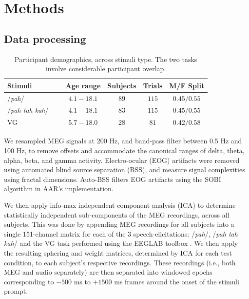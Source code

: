 \documentclass[a4paper]{article}
\begin{document}
\section{Methods}


\subsection{Data processing}

\begin{table}[t]
  \caption{Participant demographics, across stimuli type. The two tasks involve considerable participant overlap.}
  \label{tab:subjects}
  \centering
  \begin{tabular}{ l@{}c c c c }
    \toprule
    \multicolumn{1}{l}{\textbf{Stimuli}} & \multicolumn{1}{c}{\textbf{Age range}} & \multicolumn{1}{c}{\textbf{Subjects}} & \multicolumn{1}{c}{\textbf{Trials}}  & \multicolumn{1}{c}{\textbf{M/F Split}} \\
    \midrule
    /{\em pah}/~~~                    & $4.1-18.1$   &   $89$   &   $115$   &   $0.45/0.55$ \\
    /{\em pah tah kah}/~~~            & $4.1-18.1$   &   $83$   &   $115$   &   $0.45/0.55$ \\
    VG~~~                             & $5.7-18.0$   &   $28$   &   $81$    &   $0.42/0.58$  \\
    \bottomrule
  \end{tabular}
\end{table}

We resampled MEG signals at 200 Hz, and band-pass filter between 0.5 Hz and 100 Hz, to remove offsets and accommodate the canonical ranges of delta, theta, alpha, beta, and gamma activity. Electro-ocular (EOG) artifacts were removed using automated blind source separation (BSS), and measure signal complexities using fractal dimensions. Auto-BSS filters EOG artifacts using the SOBI algorithm in AAR's implementation.

We then apply info-max independent component analysis (ICA) \cite{Bell1995} to determine statistically independent sub-components of the MEG recordings, across all subjects. This was done by appending MEG recordings for all subjects into a single 151-channel matrix for each of the 3 speech-elicitations: /{\em pah}/, /{\em pah tah kah}/ and the VG task performed using the EEGLAB toolbox \cite{Delorme04eeglab}. We then apply the resulting sphering and weight matrices, determined by ICA for each test condition, to each subject's respective recordings. These recordings (i.e., both MEG and audio separately) are then separated into windowed epochs corresponding to $-500$ ms to $+1500$ ms frames around the onset of the stimuli prompt.
\end{document}
